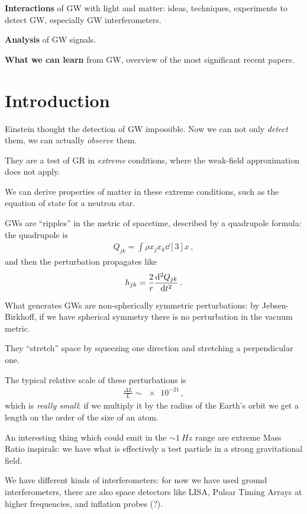\documentclass[main.tex]{subfiles}
\begin{document}
\textbf{Interactions} of GW with light and matter: ideas, techniques, experiments to detect GW, especially GW interferometers.

\textbf{Analysis} of GW signals. 

\textbf{What we can learn} from GW, overview of the most significant recent papers. 

\section{Introduction}


Einstein thought the detection of GW impossible. 
Now we can not only \emph{detect} them, we can actually \emph{observe} them.

They are a test of GR in \emph{extreme} conditions, where the weak-field approximation does not apply.

We can derive properties of matter in these extreme conditions, such as the equation of state for a neutron star.

GWs are ``ripples'' in the metric of spacetime, described by a quadrupole formula: the quadrupole is 
%
\begin{align}
Q_{jk} = \int \rho x_{j} x_{k} \dd[3]{x}
\,,
\end{align}
%
and then the perturbation propagates like 
%
\begin{align}
h_{jk} = \frac{2}{r} \dv[2]{Q_{jk}}{t}
\,.
\end{align}

What generates GWs are non-spherically symmetric perturbations: by Jebsen-Birkhoff, if we have spherical symmetry there is no perturbation in the vacuum metric.

They ``stretch'' space by squeezing one direction and stretching a perpendicular one.

The typical relative scale of these perturbations is 
%
\begin{align}
\frac{\Delta L}{L} \sim \num{e-21}
\,,
\end{align}
%
which is \emph{really small}: if we multiply it by the radius of the Earth's orbit we get a length on the order of the size of an atom.

An interesting thing which could emit in the \(\sim \SI{1}{Hz}\) range are extreme Mass Ratio inspirals: we have what is effectively a test particle in a strong gravitational field.

We have different kinds of interferometers: for now we have used ground interferometers, there are also space detectors like LISA, Pulsar Timing Arrays at higher frequencies, and inflation probes (?).
\end{document}
